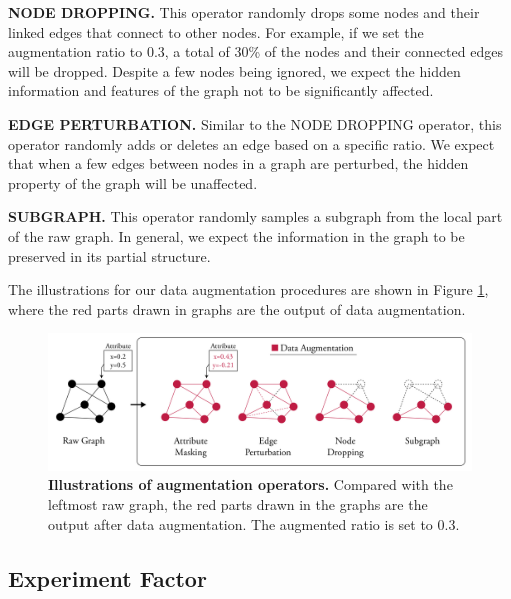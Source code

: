 \textbf{\uppercase{node dropping.}} This operator randomly drops some nodes and their linked edges that connect to other nodes. For example, if we set the augmentation ratio to $0.3$, a total of 30\% of the nodes and their connected edges will be dropped. Despite a few nodes being ignored, we expect the hidden information and features of the graph not to be significantly affected.	

\textbf{\uppercase{edge perturbation.}} Similar to the \uppercase{node dropping} operator, this operator randomly adds or deletes an edge based on a specific ratio. We expect that when a few edges between nodes in a graph are perturbed, the hidden property of the graph will be unaffected. 


\textbf{\uppercase{subgraph.}} This operator randomly samples a subgraph from the local part of the raw graph. In general, we expect the information in the graph to be preserved in its partial structure. 


The illustrations for our data augmentation procedures are shown in Figure \ref{fig:aug}, where the red parts drawn in graphs are the output of data augmentation.


\begin{figure}[!htbp]
\centering
\includegraphics[width=1\textwidth]{./figures/data_augmetation_aka.png}
\vspace{0.5cm}
\caption[Illustrations of augmentation operators]{\textbf{Illustrations of augmentation operators.} Compared with the leftmost raw graph, the red parts drawn in the graphs are the output after data augmentation. The augmented ratio is set to 0.3.}
\label{fig:aug}
\end{figure}





\subsection{Experiment Factor}


